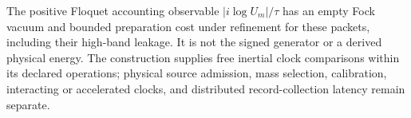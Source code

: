 The positive Floquet accounting observable $|i\log U_m|/\tau$ has an
empty Fock vacuum and bounded preparation cost under refinement for these
packets, including their high-band leakage. It is not the signed generator
or a derived physical energy. The construction supplies free inertial
clock comparisons within its declared operations; physical source admission,
mass selection, calibration, interacting or accelerated clocks, and
distributed record-collection latency remain separate.
